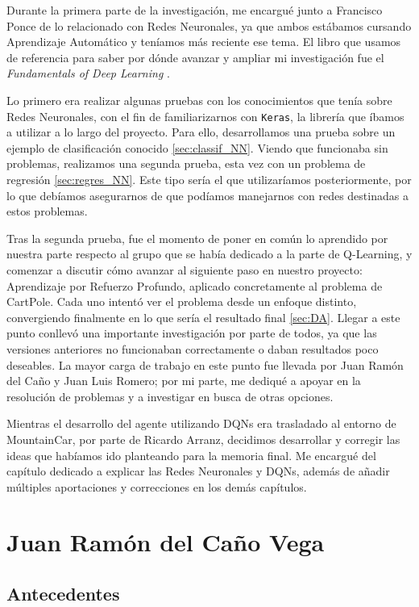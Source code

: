 Durante la primera parte de la investigación, me encargué junto a Francisco Ponce de lo relacionado con Redes Neuronales, ya que ambos estábamos cursando Aprendizaje Automático y teníamos más reciente ese tema. El libro que usamos de referencia para saber por dónde avanzar y ampliar mi investigación fue el \textit{Fundamentals of Deep Learning} \citep{Buduma:general}.

Lo primero era realizar algunas pruebas con los conocimientos que tenía sobre Redes Neuronales, con el fin de familiarizarnos con \texttt{Keras}, la librería que íbamos a utilizar a lo largo del proyecto. Para ello, desarrollamos una prueba sobre un ejemplo de clasificación conocido \ref{sec:classif_NN}. Viendo que funcionaba sin problemas, realizamos una segunda prueba, esta vez con un problema de regresión \ref{sec:regres_NN}. Este tipo sería el que utilizaríamos posteriormente, por lo que debíamos asegurarnos de que podíamos manejarnos con redes destinadas a estos problemas. 

Tras la segunda prueba, fue el momento de poner en común lo aprendido por nuestra parte respecto al grupo que se había dedicado a la parte de Q-Learning, y comenzar a discutir cómo avanzar al siguiente paso en nuestro proyecto: Aprendizaje por Refuerzo Profundo, aplicado concretamente al problema de CartPole. Cada uno intentó ver el problema desde un enfoque distinto, convergiendo finalmente en lo que sería el resultado final \ref{sec:DA}. Llegar a este punto conllevó una importante investigación por parte de todos, ya que las versiones anteriores no funcionaban correctamente o daban resultados poco deseables. La mayor carga de trabajo en este punto fue llevada por Juan Ramón del Caño y Juan Luis Romero; por mi parte, me dediqué a apoyar en la resolución de problemas y a investigar en busca de otras opciones.

Mientras el desarrollo del agente utilizando DQNs era trasladado al entorno de MountainCar, por parte de Ricardo Arranz, decidimos desarrollar y corregir las ideas que habíamos ido planteando para la memoria final. Me encargué del capítulo dedicado a explicar las Redes Neuronales y DQNs, además de añadir múltiples aportaciones y correcciones en los demás capítulos.


\section{Juan Ramón del Caño Vega}


\subsection{Antecedentes}

